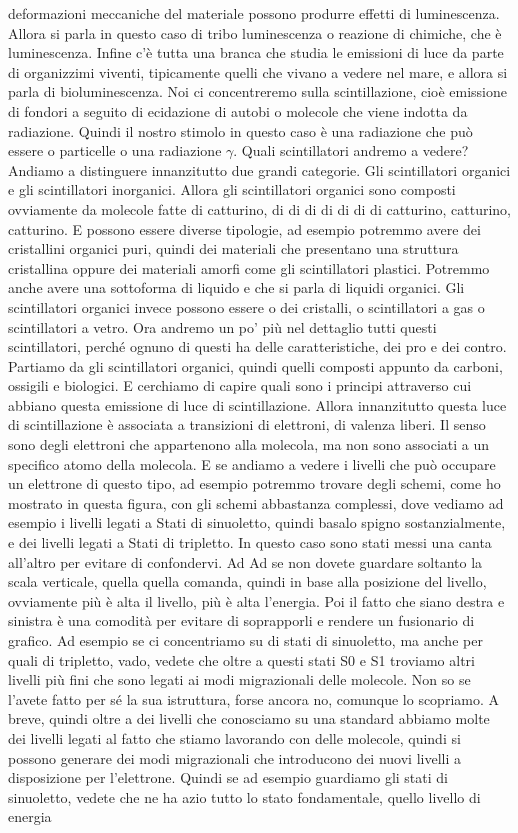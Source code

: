 {deformazioni meccaniche del materiale possono produrre effetti di luminescenza. Allora si parla in questo caso di tribo luminescenza o reazione di chimiche, che è luminescenza. Infine c'è tutta una branca che studia le emissioni di luce da parte di organizzimi viventi, tipicamente quelli che vivano a vedere nel mare, e allora si parla di bioluminescenza. Noi ci concentreremo sulla scintillazione, cioè emissione di fondori a seguito di ecidazione di autobi o molecole che viene indotta da radiazione. Quindi il nostro stimolo in questo caso è una radiazione che può essere o particelle o una radiazione $\gamma$. Quali scintillatori andremo a vedere? Andiamo a distinguere innanzitutto due grandi categorie. Gli scintillatori organici e gli scintillatori inorganici. Allora gli scintillatori organici sono composti ovviamente da molecole fatte di catturino, di di di di di di di catturino, catturino, catturino. E possono essere diverse tipologie, ad esempio potremmo avere dei cristallini organici puri, quindi dei materiali che presentano una struttura cristallina oppure dei materiali amorfi come gli scintillatori plastici. Potremmo anche avere una sottoforma di liquido e che si parla di liquidi organici. Gli scintillatori organici invece possono essere o dei cristalli, o scintillatori a gas o scintillatori a vetro. Ora andremo un po' più nel dettaglio tutti questi scintillatori, perché ognuno di questi ha delle caratteristiche, dei pro e dei contro. Partiamo da gli scintillatori organici, quindi quelli composti appunto da carboni, ossigili e biologici. E cerchiamo di capire quali sono i principi attraverso cui abbiano questa emissione di luce di scintillazione. Allora innanzitutto questa luce di scintillazione è associata a transizioni di elettroni, di valenza liberi. Il senso sono degli elettroni che appartenono alla molecola, ma non sono associati a un specifico atomo della molecola. E se andiamo a vedere i livelli che può occupare un elettrone di questo tipo, ad esempio potremmo trovare degli schemi, come ho mostrato in questa figura, con gli schemi abbastanza complessi, dove vediamo ad esempio i livelli legati a Stati di sinuoletto, quindi basalo spigno sostanzialmente, e dei livelli legati a Stati di tripletto. In questo caso sono stati messi una canta all'altro per evitare di confondervi. Ad Ad se non dovete guardare soltanto la scala verticale, quella quella comanda, quindi in base alla posizione del livello, ovviamente più è alta il livello, più è alta l'energia. Poi il fatto che siano destra e sinistra è una comodità per evitare di soprapporli e rendere un fusionario di grafico. Ad esempio se ci concentriamo su di stati di sinuoletto, ma anche per quali di tripletto, vado, vedete che oltre a questi stati S0 e S1 troviamo altri livelli più fini che sono legati ai modi migrazionali delle molecole. Non so se l'avete fatto per sé la sua istruttura, forse ancora no, comunque lo scopriamo. A breve, quindi oltre a dei livelli che conosciamo su una standard abbiamo molte dei livelli legati al fatto che stiamo lavorando con delle molecole, quindi si possono generare dei modi migrazionali che introducono dei nuovi livelli a disposizione per l'elettrone. Quindi se ad esempio guardiamo gli stati di sinuoletto, vedete che ne ha azio tutto lo stato fondamentale, quello livello di energia }
